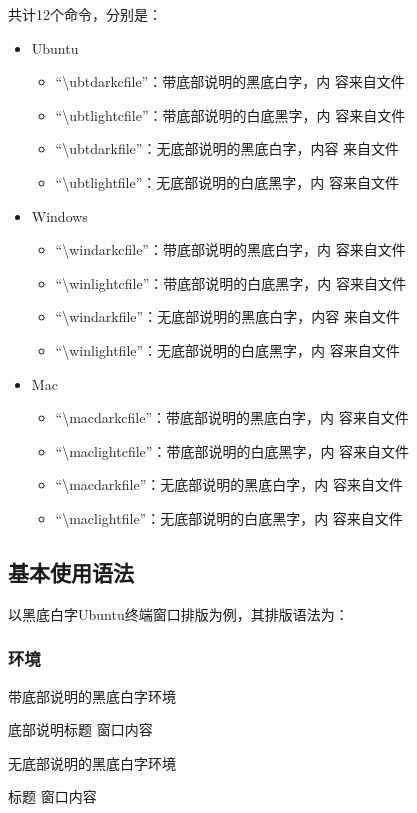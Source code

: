 \documentclass{ctexart}
\newcommand{\qtmark}[1]{``#1''}
\begin{document}
共计12个命令，分别是：
\begin{itemize}
\item Ubuntu
  \begin{itemize}
  \item \qtmark{\textbackslash ubtdarkcfile}：带底部说明的黑底白字，内
    容来自文件
  \item \qtmark{\textbackslash ubtlightcfile}：带底部说明的白底黑字，内
    容来自文件
  \item \qtmark{\textbackslash ubtdarkfile}：无底部说明的黑底白字，内容
    来自文件
  \item \qtmark{\textbackslash ubtlightfile}：无底部说明的白底黑字，内
    容来自文件
  \end{itemize}
\item Windows
  \begin{itemize}
  \item \qtmark{\textbackslash windarkcfile}：带底部说明的黑底白字，内
    容来自文件
  \item \qtmark{\textbackslash winlightcfile}：带底部说明的白底黑字，内
    容来自文件
  \item \qtmark{\textbackslash windarkfile}：无底部说明的黑底白字，内容
    来自文件
  \item \qtmark{\textbackslash winlightfile}：无底部说明的白底黑字，内
    容来自文件
  \end{itemize}
\item Mac
  \begin{itemize}
  \item \qtmark{\textbackslash macdarkcfile}：带底部说明的黑底白字，内
    容来自文件
  \item \qtmark{\textbackslash maclightcfile}：带底部说明的白底黑字，内
    容来自文件
  \item \qtmark{\textbackslash macdarkfile}：无底部说明的黑底白字，内
    容来自文件
  \item \qtmark{\textbackslash maclightfile}：无底部说明的白底黑字，内
    容来自文件
  \end{itemize}
\end{itemize}
\subsection{基本使用语法}
以黑底白字Ubuntu终端窗口排版为例，其排版语法为：
\subsubsection{环境}
\begin{langPyOne}[tex]{带底部说明的黑底白字环境}
  \begin{ubtdarkc}{底部说明}{标题}
    窗口内容
  \end{ubtdarkc}
\end{langPyOne}
\begin{langPyOne}[tex]{无底部说明的黑底白字环境}
  \begin{ubtdark}{标题}
    窗口内容
  \end{ubtdark}
\end{langPyOne}
\end{document}
